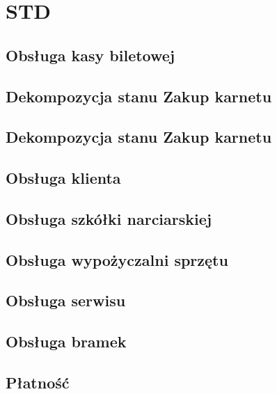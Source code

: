 \newpage
\section{STD}

\subsection{Obsługa kasy biletowej}
\begin{figure}
	
\end{figure}

\newpage
\subsection{Dekompozycja stanu Zakup karnetu}
\begin{figure}
	
\end{figure}

\newpage
\subsection{Dekompozycja stanu Zakup karnetu}
\begin{figure}
	
\end{figure}

\newpage
\subsection{Obsługa klienta}
\begin{figure}
	
\end{figure}

\newpage
\subsection{Obsługa szkółki narciarskiej}
\begin{figure}
	
\end{figure}

\newpage
\subsection{Obsługa wypożyczalni sprzętu}
\begin{figure}
	
\end{figure}

\newpage
\subsection{Obsługa serwisu}
\begin{figure}
	
\end{figure}

\newpage
\subsection{Obsługa bramek}
\begin{figure}
	
\end{figure}

\newpage
\subsection{Płatność}
\begin{figure}
	
\end{figure}